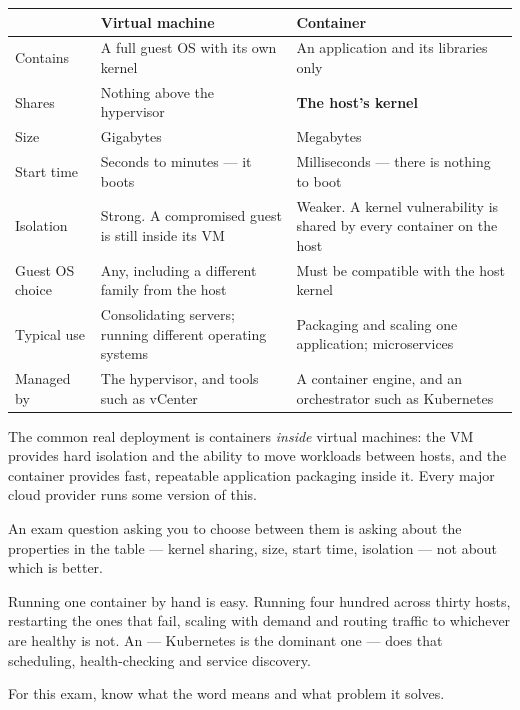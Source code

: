 \begin{longtable}{@{}L{3.0cm}L{5.8cm}L{6.1cm}@{}}
\toprule
{}
\textbf{} & \textbf{Virtual machine} & \textbf{Container} \\
\midrule
\endhead
Contains & A full guest OS with its own kernel &
An application and its libraries only \\
Shares & Nothing above the hypervisor &
\textbf{The host's kernel} \\
Size & Gigabytes & Megabytes \\
Start time & Seconds to minutes --- it boots &
Milliseconds --- there is nothing to boot \\
Isolation & Strong. A compromised guest is still inside its VM &
Weaker. A kernel vulnerability is shared by every container on the host \\
Guest OS choice & Any, including a different family from the host &
Must be compatible with the host kernel \\
Typical use & Consolidating servers; running different operating systems &
Packaging and scaling one application; microservices \\
Managed by & The hypervisor, and tools such as vCenter &
A container engine, and an orchestrator such as Kubernetes \\
\bottomrule
\end{longtable}

\begin{conceptbox}
The common real deployment is containers \emph{inside} virtual machines: the VM
provides hard isolation and the ability to move workloads between hosts, and the
container provides fast, repeatable application packaging inside it. Every major
cloud provider runs some version of this.

An exam question asking you to choose between them is asking about the properties
in the table --- kernel sharing, size, start time, isolation --- not about which
is better.
\end{conceptbox}

\begin{definitionbox}[Orchestration]
Running one container by hand is easy. Running four hundred across thirty hosts,
restarting the ones that fail, scaling with demand and routing traffic to
whichever are healthy is not. An  --- Kubernetes is the
dominant one --- does that scheduling, health-checking and service discovery.

For this exam, know what the word means and what problem it solves.
\end{definitionbox}

